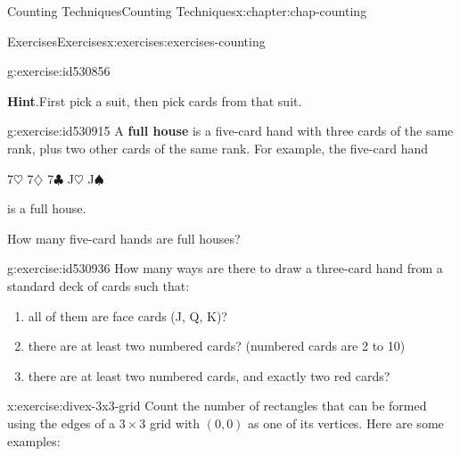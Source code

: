 \documentclass[oneside,10pt,]{book}
\newcommand{\blocktitlefont}{\relax}
\newcommand{\terminology}[1]{\textbf{#1}}
\numberwithin{equation}{section}
\begin{document}
\begin{chapterptx}{Counting Techniques}{}{Counting Techniques}{}{}{x:chapter:chap-counting}
\begin{exercises-section}{Exercises}{}{Exercises}{}{}{x:exercises:exercises-counting}
\begin{divisionexercise}{9}{}{}{g:exercise:id530856}
\begin{enumerate}[label=(\alph*)]
\end{enumerate}
%
\par\smallskip%
\noindent\textbf{\blocktitlefont Hint}.\hypertarget{g:hint:id530903}{}\quad{}First pick a suit, then pick cards from that suit.%
\end{divisionexercise}%
\begin{divisionexercise}{10}{}{}{g:exercise:id530915}%
A \terminology{full house} is a five-card hand with three cards of the same rank, plus two other cards of the same rank. For example, the five-card hand%
\begin{sidebyside}{1}{0.3}{0.3}{0}%
\begin{sbspanel}{0.4}%
7\(\heartsuit\) 7\(\diamondsuit\) 7\(\clubsuit\) J\(\heartsuit\) J\(\spadesuit\)%
\end{sbspanel}%
\end{sidebyside}%
\par
is a full house.%
\par
How many five-card hands are full houses?%
\end{divisionexercise}%
\begin{divisionexercise}{11}{}{}{g:exercise:id530936}%
How many ways are there to draw a three-card hand from a standard deck of cards such that:%
\begin{enumerate}[label=(\alph*)]
\item{}all of them are face cards (J, Q, K)?%
\item{}there are at least two numbered cards? (numbered cards are 2 to 10)%
\item{}there are at least two numbered cards, and exactly two red cards?%
\end{enumerate}
%
\end{divisionexercise}%
\begin{divisionexercise}{12}{}{}{x:exercise:divex-3x3-grid}%
Count the number of rectangles that can be formed using the edges of a \(3 \times 3\) grid with \((0,0)\) as one of its vertices. Here are some examples:%
\begin{sidebyside}{3}{0.0916666666666667}{0.0916666666666667}{0.183333333333333}%
\begin{sbspanel}{0.15}%
%
\end{sbspanel}%

\end{sidebyside}
\end{divisionexercise}
\end{exercises-section}
\end{chapterptx}
\end{document}
